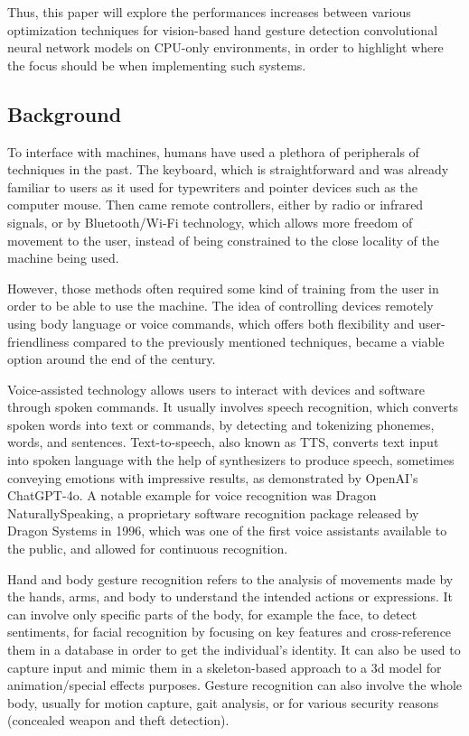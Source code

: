 \documentclass[12pt]{article}
\begin{document}
Thus, this paper will explore the performances increases between various optimization techniques for vision-based hand gesture detection convolutional neural network models on CPU-only environments, in order to highlight where the focus should be when implementing such systems.  

\subsection{Background}

To interface with machines, humans have used a plethora of peripherals of techniques in the past. The keyboard, which is straightforward and was already familiar to users as it used for typewriters and pointer devices such as the computer mouse. Then came remote controllers, either by radio or infrared signals, or by Bluetooth/Wi-Fi technology, which allows more freedom of movement to the user, instead of being constrained to the close locality of the machine being used.

However, those methods often required some kind of training from the user in order to be able to use the machine. The idea of controlling devices remotely using body language or voice commands, which offers both flexibility and user-friendliness compared to the previously mentioned techniques, became a viable option around the end of the century.

Voice-assisted technology allows users to interact with devices and software through spoken commands. It usually involves speech recognition, which converts spoken words into text or commands, by detecting and tokenizing phonemes, words, and sentences. Text-to-speech, also known as TTS, converts text input into spoken language with the help of synthesizers to produce speech, sometimes conveying emotions with impressive results, as demonstrated by OpenAI's ChatGPT-4o. A notable example for voice recognition was Dragon NaturallySpeaking, a proprietary software recognition package released by Dragon Systems in 1996, which was one of the first voice assistants available to the public, and allowed for continuous recognition.

Hand and body gesture recognition refers to the analysis of movements made by the hands, arms, and body to understand the intended actions or expressions. It can involve only specific parts of the body, for example the face, to detect sentiments, for facial recognition by focusing on key features and cross-reference them in a database in order to get the individual's identity. It can also be used to capture input and mimic them in a skeleton-based approach to a 3d model for animation/special effects purposes.
Gesture recognition can also involve the whole body, usually for motion capture, gait analysis, or for various security reasons (concealed weapon and theft detection).
\end{document}
